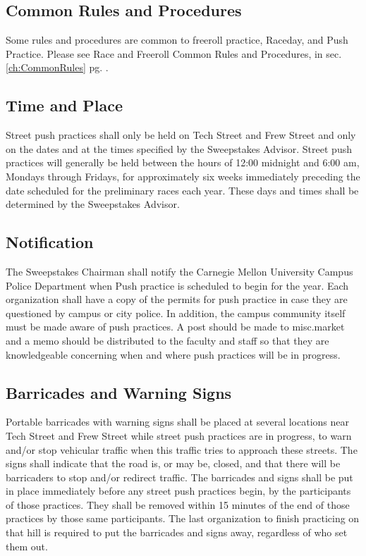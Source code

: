 \subsection{Common Rules and Procedures}
	Some rules and procedures are common to freeroll practice, Raceday, and Push Practice. Please see Race and Freeroll Common Rules and Procedures, in sec. \ref{ch:CommonRules} pg. \pageref{ch:CommonRules}.
	
\subsection{Time and Place}

	Street push practices shall only be held on Tech Street and Frew Street and only on the dates and at the times specified by the Sweepstakes Advisor. Street push practices will generally be held between the hours of 12:00 midnight and 6:00 am, Mondays through Fridays, for approximately six weeks immediately preceding the date scheduled for the preliminary races each year. These days and times shall be determined by the Sweepstakes Advisor.

\subsection{Notification}

	The Sweepstakes Chairman shall notify the Carnegie Mellon University Campus Police Department when Push practice is scheduled to begin for the year. Each organization shall have a copy of the permits for push practice in case they are questioned by campus or city police. In addition, the campus community itself must be made aware of push practices. A post should be made to misc.market and a memo should be distributed to the faculty and staff so that they are knowledgeable concerning when and where push practices will be in progress.

\subsection{Barricades and Warning Signs}
\label{subsec:Freeroll Barricades}

	Portable barricades with warning signs shall be placed at several locations near Tech Street and Frew Street while street push practices are in progress, to warn and/or stop vehicular traffic when this traffic tries to approach these streets. The signs shall indicate that the road is, or may be, closed, and that there will be barricaders to stop and/or redirect traffic. The barricades and signs shall be put in place immediately before any street push practices begin, by the participants of those practices. They shall be removed within 15 minutes of the end of those practices by those same participants. The last organization to finish practicing on that hill is required to put the barricades and signs away, regardless of who set them out.

